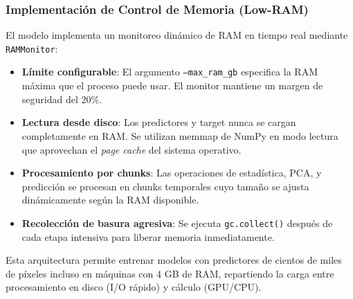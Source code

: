 \subsubsection{Implementación de Control de Memoria (Low-RAM)}

El modelo implementa un monitoreo dinámico de RAM en tiempo real mediante \texttt{RAMMonitor}:

\begin{itemize}
    \item \textbf{Límite configurable}: El argumento \texttt{--max\_ram\_gb} especifica la RAM máxima que el proceso puede usar. El monitor mantiene un margen de seguridad del 20\%.
    
    \item \textbf{Lectura desde disco}: Los predictores y target nunca se cargan completamente en RAM. Se utilizan memmap de NumPy en modo lectura que aprovechan el \textit{page cache} del sistema operativo.
    
    \item \textbf{Procesamiento por chunks}: Las operaciones de estadística, PCA, y predicción se procesan en chunks temporales cuyo tamaño se ajusta dinámicamente según la RAM disponible.
    
    \item \textbf{Recolección de basura agresiva}: Se ejecuta \texttt{gc.collect()} después de cada etapa intensiva para liberar memoria inmediatamente.
\end{itemize}

Esta arquitectura permite entrenar modelos con predictores de cientos de miles de píxeles incluso en máquinas con 4 GB de RAM, repartiendo la carga entre procesamiento en disco (I/O rápido) y cálculo (GPU/CPU).
